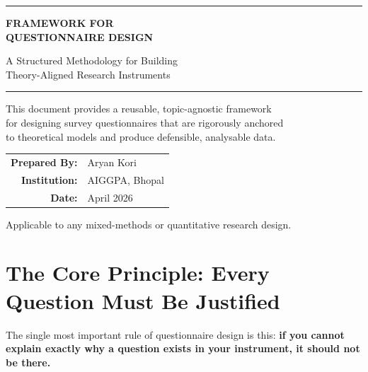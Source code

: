 \documentclass[12pt,a4paper]{article}
\begin{document}
\begin{titlepage}\centering
\vspace*{2.5cm}
{\color{gold}\rule{0.6\textwidth}{2pt}}\vspace{1cm}

{\Huge\bfseries\color{navy} FRAMEWORK FOR\\[6pt] QUESTIONNAIRE DESIGN}

\vspace{0.5cm}

{\Large\color{dk} A Structured Methodology for Building\\[4pt] Theory-Aligned Research Instruments}

\vspace{1cm}
{\color{gold}\rule{0.6\textwidth}{2pt}}

\vspace{2.5cm}

{\large\color{mg} This document provides a reusable, topic-agnostic framework\\[4pt] for designing survey questionnaires that are rigorously anchored\\[4pt] to theoretical models and produce defensible, analysable data.}

\vspace{2cm}

\begin{tabular}{r l}
\textbf{\color{navy}Prepared By:} & Aryan Kori \\[6pt]
\textbf{\color{navy}Institution:} & AIGGPA, Bhopal \\[6pt]
\textbf{\color{navy}Date:} & April 2026 \\
\end{tabular}

\vfill
{\small\color{mg} Applicable to any mixed-methods or quantitative research design.}
\end{titlepage}

\tableofcontents
\newpage

\section{The Core Principle: Every Question Must Be Justified}

The single most important rule of questionnaire design is this: \textbf{if you cannot explain exactly why a question exists in your instrument, it should not be there.}
\end{document}
